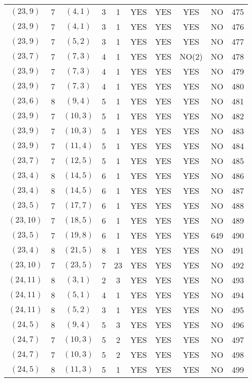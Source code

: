 \begin{longtable}{|c|c|c|c|c|c|c|c|c|c|}
$(23, 9)$ & 7 & $(4, 1)$ & 3 & 1 & YES & YES & YES & NO & 475\\
$(23, 9)$ & 7 & $(4, 1)$ & 3 & 1 & YES & YES & YES & NO & 476\\
$(23, 9)$ & 7 & $(5, 2)$ & 3 & 1 & YES & YES & YES & NO & 477\\
$(23, 7)$ & 7 & $(7, 3)$ & 4 & 1 & YES & YES & NO(2) & NO & 478\\
$(23, 9)$ & 7 & $(7, 3)$ & 4 & 1 & YES & YES & YES & NO & 479\\
$(23, 9)$ & 7 & $(7, 3)$ & 4 & 1 & YES & YES & YES & NO & 480\\
$(23, 6)$ & 8 & $(9, 4)$ & 5 & 1 & YES & YES & YES & NO & 481\\
$(23, 9)$ & 7 & $(10, 3)$ & 5 & 1 & YES & YES & YES & NO & 482\\
$(23, 9)$ & 7 & $(10, 3)$ & 5 & 1 & YES & YES & YES & NO & 483\\
$(23, 9)$ & 7 & $(11, 4)$ & 5 & 1 & YES & YES & YES & NO & 484\\
$(23, 7)$ & 7 & $(12, 5)$ & 5 & 1 & YES & YES & YES & NO & 485\\
$(23, 4)$ & 8 & $(14, 5)$ & 6 & 1 & YES & YES & YES & NO & 486\\
$(23, 4)$ & 8 & $(14, 5)$ & 6 & 1 & YES & YES & YES & NO & 487\\
$(23, 5)$ & 7 & $(17, 7)$ & 6 & 1 & YES & YES & YES & NO & 488\\
$(23, 10)$ & 7 & $(18, 5)$ & 6 & 1 & YES & YES & YES & NO & 489\\
$(23, 5)$ & 7 & $(19, 8)$ & 6 & 1 & YES & YES & YES & 649 & 490\\
$(23, 4)$ & 8 & $(21, 5)$ & 8 & 1 & YES & YES & YES & NO & 491\\
$(23, 10)$ & 7 & $(23, 5)$ & 7 & 23 & YES & YES & YES & NO & 492\\
$(24, 11)$ & 8 & $(3, 1)$ & 2 & 3 & YES & YES & YES & NO & 493\\
$(24, 11)$ & 8 & $(5, 1)$ & 4 & 1 & YES & YES & YES & NO & 494\\
$(24, 11)$ & 8 & $(5, 2)$ & 3 & 1 & YES & YES & YES & NO & 495\\
$(24, 5)$ & 8 & $(9, 4)$ & 5 & 3 & YES & YES & YES & NO & 496\\
$(24, 7)$ & 7 & $(10, 3)$ & 5 & 2 & YES & YES & YES & NO & 497\\
$(24, 7)$ & 7 & $(10, 3)$ & 5 & 2 & YES & YES & YES & NO & 498\\
$(24, 5)$ & 8 & $(11, 3)$ & 5 & 1 & YES & YES & YES & NO & 499\\

\end{longtable}
